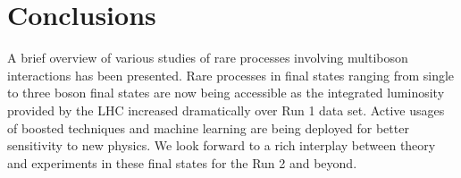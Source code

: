 \begin{figure}[htb]
\centering
\caption{}
\label{fig:VBSWWFuture}
\end{figure}


\section{Conclusions}

A brief overview of various studies of rare processes involving multiboson interactions has been presented.
Rare processes in final states ranging from single to three boson final states are now being accessible as the integrated luminosity provided by the LHC increased dramatically over Run 1 data set.
Active usages of boosted techniques and machine learning are being deployed for better sensitivity to new physics.
We look forward to a rich interplay between theory and experiments in these final states for the Run 2 and beyond.


